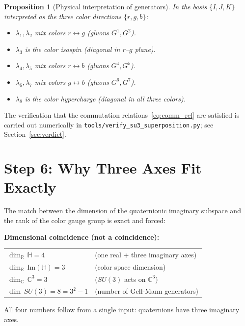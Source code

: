\documentclass[12pt,a4paper]{article}
\newtheorem{proposition}[theorem]{Proposition}
\theoremstyle{definition}
\theoremstyle{remark}
\begin{document}
\begin{proposition}[Physical interpretation of generators]
\label{prop:generators_interpretation}
In the basis $\{I, J, K\}$ interpreted as the three color directions
$\{r, g, b\}$:
\begin{itemize}
  \item $\lambda_1, \lambda_2$ mix colors $r \leftrightarrow g$ (gluons
        $G^1, G^2$).
  \item $\lambda_3$ is the color isospin (diagonal in $r$--$g$ plane).
  \item $\lambda_4, \lambda_5$ mix colors $r \leftrightarrow b$ (gluons
        $G^4, G^5$).
  \item $\lambda_6, \lambda_7$ mix colors $g \leftrightarrow b$ (gluons
        $G^6, G^7$).
  \item $\lambda_8$ is the color hypercharge (diagonal in all three colors).
\end{itemize}
\end{proposition}

The verification that the commutation relations~\eqref{eq:comm_rel} are
satisfied is carried out numerically in
\texttt{tools/verify\_su3\_superposition.py}; see Section~\ref{sec:verdict}.

\section{Step 6: Why Three Axes Fit Exactly}
\label{sec:why_three}

The match between the dimension of the quaternionic imaginary subspace and
the rank of the color gauge group is exact and forced:

\begin{insightbox}
\textbf{Dimensional coincidence (not a coincidence):}
\begin{center}
\begin{tabular}{ll}
  $\dim_\mathbb{R}\,\mathbb{H} = 4$ & (one real + three imaginary axes) \\
  $\dim_\mathbb{R}\,\mathrm{Im}(\mathbb{H}) = 3$ & (color space dimension) \\
  $\dim_\mathbb{C}\,\mathbb{C}^3 = 3$ & ($SU(3)$ acts on $\mathbb{C}^3$) \\
  $\dim\,SU(3) = 8 = 3^2 - 1$ & (number of Gell-Mann generators)
\end{tabular}
\end{center}
All four numbers follow from a single input: quaternions have three
imaginary axes.
\end{insightbox}
\end{document}
